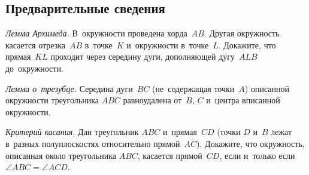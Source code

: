 


\subsection*{Предварительные сведения}

\begin{exercises}


\item \emph{Лемма Архимеда.}
В~окружности проведена хорда~$AB$.
Другая окружность касается отрезка~$AB$ в~точке~$K$ и~окружности в~точке~$L$.
Докажите, что прямая~$KL$ проходит через середину дуги, дополняющей дугу~$ALB$
до~окружности.

\item \emph{Лемма о~трезубце.}
Середина дуги~$BC$ (не~содержащая точки~$A$) описанной окружности
треугольника $ABC$ равноудалена от~$B$, $C$ и~центра вписанной окружности.

\item \emph{Критерий касания.}
Дан треугольник $ABC$ и~прямая~$CD$
(точки $D$ и~$B$ лежат в~разных полуплоскостях относительно прямой~$AC$).
Докажите, что окружность, описанная около треугольника $ABC$, касается
прямой~$CD$, если и~только если $\angle ABC = \angle ACD$.



\end{exercises}

